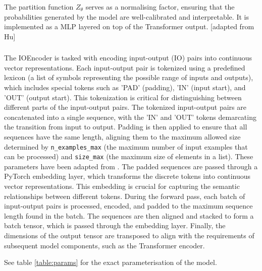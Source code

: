 \subsubsection{}
The partition function $Z_\theta$ serves as a normalising factor, ensuring that the probabilities generated by the model are well-calibrated and interpretable. It is implemented as a MLP layered on top of the Transformer output.
[adapted from Hu]


\subsubsection{} \label{sec:ioencoder}
The IOEncoder is tasked with encoding input-output (IO) pairs into continuous vector representations.
Each input-output pair is tokenized using a predefined lexicon (a list of symbols representing the possible range of inputs and outputs), which includes special tokens such as 'PAD' (padding), 'IN' (input start), and 'OUT' (output start). This tokenization is critical for distinguishing between different parts of the input-output pairs.
The tokenized input-output pairs are concatenated into a single sequence, with the 'IN' and 'OUT' tokens demarcating the transition from input to output. Padding is then applied to ensure that all sequences have the same length, aligning them to the maximum allowed size determined by \texttt{n\_examples\_max} (the maximum number of input examples that can be processed) and \texttt{size\_max} (the maximum size of elements in a list). These parameters have been adapted from \cite{fijalkow_scaling_2021}.
The padded sequences are passed through a PyTorch embedding layer, which transforms the discrete tokens into continuous vector representations. This embedding is crucial for capturing the semantic relationships between different tokens.
During the forward pass, each batch of input-output pairs is processed, encoded, and padded to the maximum sequence length found in the batch. The sequences are then aligned and stacked to form a batch tensor, which is passed through the embedding layer. Finally, the dimensions of the output tensor are transposed to align with the requirements of subsequent model components, such as the Transformer encoder.

See table \ref{table:params} for the exact parameterisation of the model.


